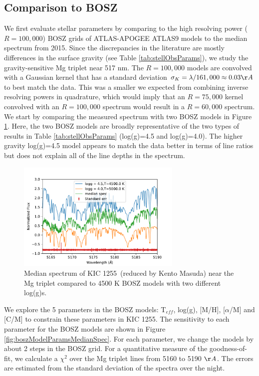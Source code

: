 \documentclass[preprint]{aastex61}
\newcommand{\shStar}{KIC 1255}
\begin{document}
\subsection{Comparison to BOSZ}
We first evaluate stellar parameters by comparing to the high resolving power ($R=100,000$) BOSZ grids of ATLAS-APOGEE ATLAS9 models \citep{bohlin2017bosz} to the median spectrum from 2015.
Since the discrepancies in the literature are mostly differences in the surface gravity (see Table \ref{tab:stellObsParams}), we study the gravity-sensitive Mg triplet near 517 nm.
The $R=100,000$ models are convolved with a Gaussian kernel that has a standard deviation $\sigma_K = \lambda/161,000 \approx 0.03 \AA$ to best match the data.
This was a smaller we expected from combining inverse resolving powers in quadrature, which would imply that an $R=75,000 $ kernel convolved with an $R=100,000$ spectrum would result in a $R=60,000$ spectrum.
We start by comparing the measured spectrum with two BOSZ models in Figure \ref{fig:mgTripletBOSZ}.
Here, the two BOSZ models are broadly representative of the two types of results in Table \ref{tab:stellObsParams} (log(g)=4.5 and log(g)=4.0).
The higher gravity log(g)=4.5 model appears to match the data better in terms of line ratios but does not explain all of the line depths in the spectrum.

\begin{figure}[!hbtp]
\begin{centering}
\includegraphics[width=0.7\textwidth]{images/subaru/bosz_mg_triplet_median_spec_w_5000.pdf}
\caption{Median spectrum of \shStar\ (reduced by Kento Masuda) near the Mg triplet compared to 4500 K BOSZ models with two different log(g)s.}\label{fig:mgTripletBOSZ}
\end{centering}
\end{figure}

We explore the 5 parameters in the BOSZ models: T$_{eff}$, log(g), [M/H], [$\alpha$/M] and [C/M] to constrain these parameters in \shStar.
The sensitivity to each parameter for the BOSZ models are shown in Figure \ref{fig:boszModelParamsMedianSpec}.
For each parameter, we change the models by about 2 steps in the BOSZ grid.
For a quantitative measure of the goodness-of-fit, we calculate a $\chi^2$ over the Mg triplet lines from 5160 to 5190 $\AA$.
The errors are estimated from the standard deviation of the spectra over the night.
\end{document}
